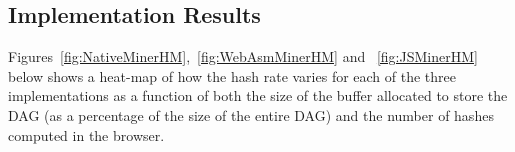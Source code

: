 \documentclass[runningheads]{llncs}
\newcommand{\trishita}[1]{{\color{magenta}\bfseries[Trishita: #1]}}
\begin{document}




\subsection{Implementation Results}
\label{sec:results}
Figures~\ref{fig:NativeMinerHM},~\ref{fig:WebAsmMinerHM} and ~\ref{fig:JSMinerHM} below shows a heat-map of how the hash rate varies for each of the three implementations as a function of both the size of the buffer allocated to store the DAG (as a percentage of the size of the entire DAG) and the number of hashes computed in the browser. 
\end{document}
